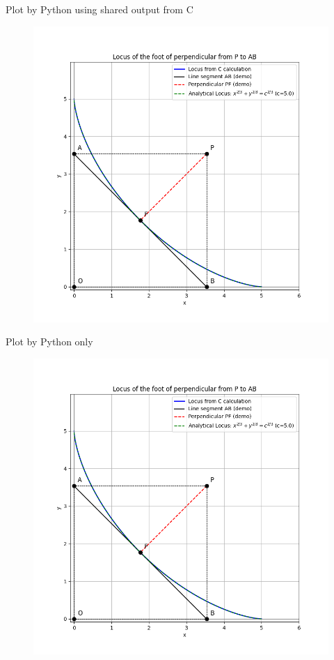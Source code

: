 \documentclass{beamer}
\begin{document}
\begin{frame}{Plot by Python using shared output from C}
\begin{figure}[H]
\centering
\includegraphics[width=0.7\columnwidth]{../figs/fig1.png}
\caption{}
\label{fig:1}
\end{figure}
\end{frame}

\begin{frame}{Plot by Python only}
\begin{figure}[H]
\centering
\includegraphics[width=0.7\columnwidth]{../figs/fig2.png}
\caption{}
\label{fig:2}
\end{figure}
\end{frame}
\end{document}
